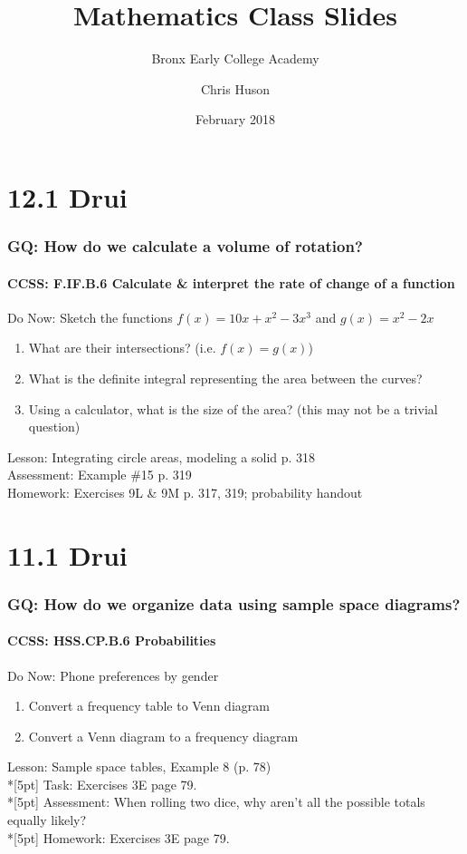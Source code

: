 \documentclass{beamer}
\title{Mathematics Class Slides}
\subtitle{Bronx Early College Academy}
\author{Chris Huson}
\date{February 2018}
\begin{document}
\frame{\titlepage}


\section{12.1 Drui}
\frame
{
  \frametitle{GQ: How do we calculate a volume of rotation?}
  \framesubtitle{CCSS: F.IF.B.6 Calculate \& interpret the rate of change of a function}

  \begin{block}{Do Now: Sketch the functions $f(x)=10x+x^2-3x^3$ and $g(x)=x^2-2x$}
  \begin{enumerate}
      \item What are their intersections? (i.e. $f(x)=g(x)$)
      \item What is the definite integral representing the area between the curves?
      \item Using a calculator, what is the size of the area? (this may not be a trivial question)
  \end{enumerate}
  \end{block}
  Lesson: Integrating circle areas, modeling a solid p. 318\\%
  Assessment: Example \#15 p. 319 \\%
  Homework: Exercises 9L \& 9M p. 317, 319; probability handout
}

\section{11.1 Drui}
\frame
{
  \frametitle{GQ: How do we organize data using sample space diagrams?}
  \framesubtitle{CCSS: HSS.CP.B.6 Probabilities}

  \begin{block}{Do Now: Phone preferences by gender}
  \begin{enumerate}
      \item Convert a frequency table to Venn diagram
      \item Convert a Venn diagram to a frequency diagram
  \end{enumerate}
  \end{block}
  Lesson: Sample space tables, Example 8 (p. 78)\\*[5pt]
  Task: Exercises 3E page 79.\\*[5pt]
  Assessment: When rolling two dice, why aren't all the possible totals equally likely?\\*[5pt]
  Homework: Exercises 3E page 79.  
}
\end{document}
